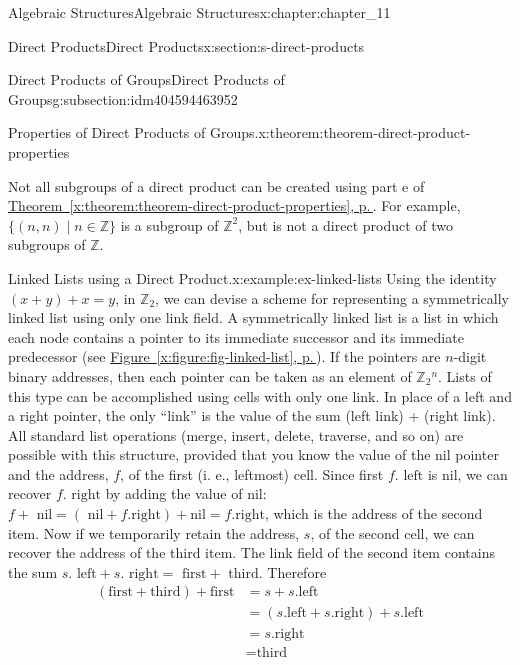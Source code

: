 \documentclass[twoside,10pt,]{book}
\newcommand{\xreffont}{\relax}
\numberwithin{equation}{section}
\begin{document}
\begin{chapterptx}{Algebraic Structures}{}{Algebraic Structures}{}{}{x:chapter:chapter_11}
\begin{sectionptx}{Direct Products}{}{Direct Products}{}{}{x:section:s-direct-products}
\begin{subsectionptx}{Direct Products of Groups}{}{Direct Products of Groups}{}{}{g:subsection:idm404594463952}
\begin{theorem}{Properties of Direct Products of Groups.}{}{x:theorem:theorem-direct-product-properties}
\begin{enumerate}[label=(\alph*)]
\end{enumerate}
%
\end{theorem}
Not all subgroups of a direct product can be created using part e of \hyperref[x:theorem:theorem-direct-product-properties]{Theorem~{\xreffont\ref{x:theorem:theorem-direct-product-properties}}, p.\,\pageref{x:theorem:theorem-direct-product-properties}}. For example, \(\{(n, n) \mid n \in  \mathbb{Z}\}\) is a subgroup of \(\mathbb{Z}^2\), but is not a direct product of two subgroups of \(\mathbb{Z}\).%
\begin{example}{Linked Lists using a Direct Product.}{x:example:ex-linked-lists}%
Using the identity \((x + y) + x = y\), in \(\mathbb{Z}_2\), we can devise a scheme for representing a symmetrically linked list using only one link field. A symmetrically linked list is a list in which each node contains a pointer to its immediate successor and its immediate predecessor (see \hyperref[x:figure:fig-linked-list]{Figure~{\xreffont\ref{x:figure:fig-linked-list}}, p.\,\pageref{x:figure:fig-linked-list}}). If the pointers are \(n\)-digit binary addresses, then each pointer can be taken as an element of \(\mathbb{Z}_2{}^n\).  Lists of this type can be accomplished using cells with only one link.  In place of a left and a right pointer, the only ``link'' is the value  of the sum (left link) + (right link). All standard list operations (merge, insert, delete, traverse, and so on) are possible with this structure, provided that you know the value of the nil pointer and the address, \(f\), of the first (i. e., leftmost) cell. Since first \(f.\textrm{ left}\) is nil, we can recover \(f.\textrm{ right}\) by adding the value of nil: \(f + \textrm{ nil} = (\textrm{ nil} + f.\textrm{right}) + \textrm{nil} = f.\textrm{right}\), which is the address of the second item. Now if we temporarily retain the address, \(s\),  of the second cell, we can recover the address of the third item. The link field of the second item contains the sum \(s.\textrm{ left} + s.\textrm{ right} = \textrm{ first} + \textrm{ third}\).  Therefore%
\begin{equation*}
\begin{split}
(\textrm{first} + \textrm{third})+ \textrm{first} &= s + s.\textrm{left}\\
&=( s.\textrm{left} + s.\textrm{right})+ s.\textrm{left}\\
&=s.\textrm{right}\\
&= \textrm{third}
\end{split}
\end{equation*}
%
\par

\end{example}
\end{subsectionptx}
\end{sectionptx}
\end{chapterptx}
\end{document}
